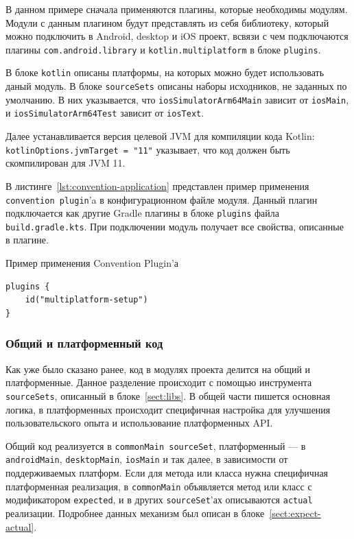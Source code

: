 \documentclass[14pt, russian]{scrartcl}
\begin{document}
В данном примере сначала применяются плагины, которые необходимы модулям. Модули с данным плагином будут представлять из себя библиотеку, который можно подключить в Android, desktop и iOS проект, всвязи с чем подключаются плагины \texttt{com.android.library} и \texttt{kotlin.multiplatform} в блоке \texttt{plugins}.

В блоке \texttt{kotlin} описаны платформы, на которых можно будет использовать даный модуль. В блоке \texttt{sourceSets} описаны наборы исходников, не заданных по умолчанию. В них указывается, что \texttt{iosSimulatorArm64Main} зависит от \texttt{iosMain}, и \texttt{iosSimulatorArm64Test} зависит от \texttt{iosText}.

Далее устанавливается версия целевой JVM для компиляции кода Kotlin: \texttt{kotlinOptions.jvmTarget = "11"} указывает, что код должен быть скомпилирован для JVM 11.

В листинге~\ref{lst:convention-application} представлен пример применения \texttt{convention plugin}'a в конфигурационном файле модуля. Данный плагин подключается как другие Gradle плагины в блоке \texttt{plugins} файла \texttt{build.gradle.kts}. При подключении модуль получает все свойства, описанные в плагине.

\begin{listing}[!htb]
\caption{Пример применения Convention Plugin'а}
\label{lst:convention-application}
\begin{verbatim}
plugins {
    id("multiplatform-setup")
}
\end{verbatim}
\end{listing}

\subsubsection{Общий и платформенный код}\label{sect:modules}

Как уже было сказано ранее, код в модулях проекта делится на общий и платформенные. Данное разделение происходит с помощью инструмента \texttt{sourceSets}, описанный в блоке~\ref{sect:libs}. В общей части пишется основная логика, в платформенных происходит специфичная настройка для улучшения пользовательского опыта и использование платформенных API.

Общий код реализуется в \texttt{commonMain sourceSet}, платформенный --- в \texttt{androidMain}, \texttt{desktopMain}, \texttt{iosMain} и так далее, в зависимости от поддерживаемых платформ. Если для метода или класса нужна специфичная платформенная реализация, в \texttt{commonMain} объявляется метод или класс с модификатором \texttt{expected}, и в других \texttt{sourceSet}'ах описываются \texttt{actual} реализации. Подробнее данных механизм был описан в блоке~\ref{sect:expect-actual}.
\end{document}
